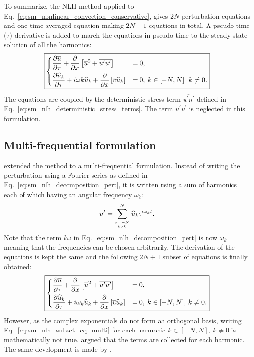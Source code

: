 To summarize, the NLH
method applied to Eq.~\eqref{eq:sm_nonlinear_convection_conservative},
gives $2N$ perturbation equations and one time
averaged equation making $2N+1$ equations in total. 
A pseudo-time ($\tau$) derivative is
added to march the equations in pseudo-time to the steady-state 
solution of all the harmonics:
\begin{equation}
	\fbox{$
	\begin{dcases}
		\frac{\partial \overline{u}}{\partial \tau} + 
		\frac{\partial}{\partial x}
			\left[\overline{u}^2 + 
			\overline{u^\prime u^\prime}\right] &=
			0, \\
		\frac{\partial \widehat{u}_k}{\partial \tau} + 
		i \omega k \widehat{u}_k + 
			\frac{\partial}{\partial x} 
			\left[ \overline{u} \widehat{u}_k\right] &= 
			0, \: k \in [-N, N], \: k \neq 0.
	\end{dcases}
	$}
	\label{eq:sm_nlh_subset_eq}
\end{equation}
The equations are coupled by the deterministic 
stress term $\overline{u^\prime u^\prime}$
defined in Eq.~\eqref{eq:sm_nlh_deterministic_stress_terms}.
The term $u^\prime u^\prime$ is neglected in this formulation.

\subsection{Multi-frequential formulation}

\citet{He2002} extended the method to a multi-frequential
formulation. Instead of writing the perturbation
using a Fourier series as defined in Eq.~\eqref{eq:sm_nlh_decomposition_pert},
it is written using a sum of harmonics each of which
having an angular frequency $\omega_k$:
\begin{equation}
	u^\prime = \sum_{k=-N \atop k \neq 0}^{N} 
	\widehat{u}_k e^{i \omega_k t}.
	\label{eq:sm_nlh_decomposition_pert_multi}
\end{equation}
Note that the term $k \omega$ in Eq.~\eqref{eq:sm_nlh_decomposition_pert}
is now $\omega_k$ meaning that the frequencies can be chosen
arbitrarily.
The derivation of the equations is kept the same and the following
$2N+1$ subset of equations is finally obtained:
\begin{equation}
	\fbox{$
	\begin{dcases}
		\frac{\partial \overline{u}}{\partial \tau} +
		\frac{\partial}{\partial x}
			\left[\overline{u}^2 + 
			\overline{u^\prime u^\prime}\right] &=
			0, \\
		\frac{\partial \widehat{u}_k}{\partial \tau} + 
		i \omega_k \widehat{u}_k + 
			\frac{\partial}{\partial x} 
			\left[ \overline{u} \widehat{u}_k\right] &= 
			0, \: k \in [-N, N], \: k \neq 0.
	\end{dcases}
	$}
	\label{eq:sm_nlh_subset_eq_multi}
\end{equation}
However, as the complex exponentials do not form
an orthogonal basis, writing Eq.~\eqref{eq:sm_nlh_subset_eq_multi}
for each harmonic $k \in [-N, N], \: k \neq 0$ is mathematically
not true. \citet{He2002} argued that the terms
are collected for each harmonic. 
The same development is made by \citet{Vilmin2006}.


